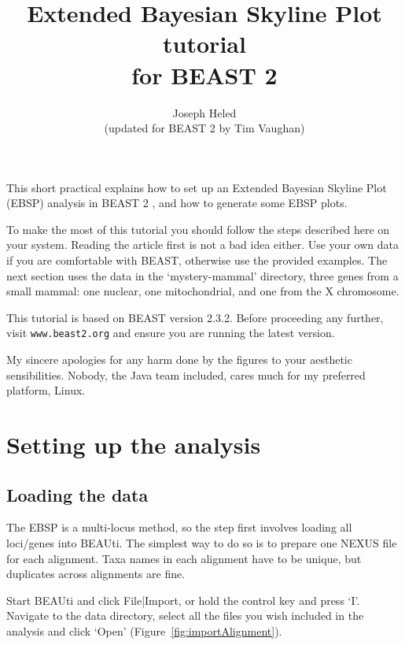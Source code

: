 \documentclass[a4paper,11pt]{article}
\title{Extended Bayesian Skyline Plot tutorial\\for BEAST 2}
\author{Joseph Heled\\(updated for BEAST 2 by Tim Vaughan)}
\begin{document}
\maketitle

This short practical explains how to set up an Extended Bayesian Skyline Plot
(EBSP) analysis in BEAST 2 \citep{Bouckaert2014}, and how to generate some EBSP
plots.

To make the most of this tutorial you should follow the steps described here on
your system. Reading the article \citep{Heled2008} first is not a bad idea
either. Use your own data if you are comfortable with BEAST, otherwise use the
provided examples.  The next section uses the data in the `mystery-mammal'
directory, three genes from a small mammal: one nuclear, one mitochondrial, and
one from the X chromosome.

This tutorial is based on BEAST version 2.3.2. Before proceeding any further,
visit \texttt{www.beast2.org} and ensure you are running the latest version.

My sincere apologies for any harm done by the figures to your aesthetic
sensibilities. Nobody, the Java team included, cares much for my preferred
platform, Linux.

\section{Setting up the analysis}

\subsection{Loading the data}

The EBSP is a multi-locus method, so the step first involves loading all
loci/genes into BEAUti. The simplest way to do so is to prepare one NEXUS file
for each alignment. Taxa names in each alignment have to be unique, but
duplicates across alignments are fine.

Start BEAUti and click File|Import, or hold the control key and press `I'.
Navigate to the data directory, select all the files you wish included in the
analysis and click `Open’ (Figure~\ref{fig:importAlignment}).
\end{document}
